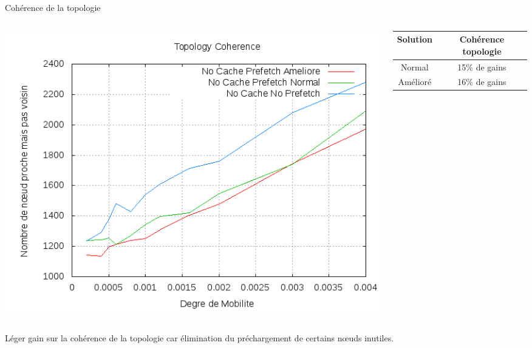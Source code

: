 \documentclass{beamer}
\begin{document}
  \begin{frame}
        \begin{center}
        Cohérence de la topologie
        \end{center}
        \begin{columns}
         \begin{column}{5cm}
          \includegraphics[scale=0.25]{./Ressources/Images/Courbes_Final_Rapport/Topology_Coherence_Prefetchs.png}\\
         \end{column}
         \begin{column}{5cm}
		\begin{table}[!h]
                \begin{center}
                \begin{tabular}{|c|c|}
                \hline
                Solution & Cohérence topologie \\
                \hline
                Normal & 15\% de gains \\
                Amélioré & 16\% de gains \\
                \hline
                \end{tabular}
                \end{center}
        \end{table}
         \end{column}
        \end{columns}
	\begin{itemize}\footnotesize{
		\item Léger gain sur la cohérence de la topologie car élimination du préchargement de certains nœuds inutiles.
		}
	\end{itemize}
  \end{frame}
\end{document}
